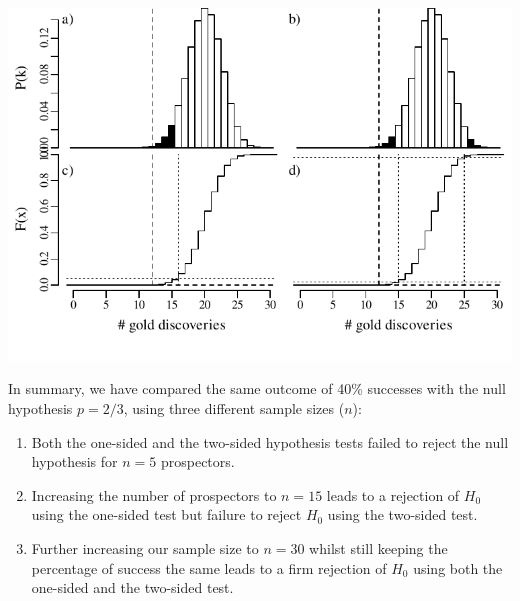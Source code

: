 \noindent\begin{minipage}[t][][b]{.65\textwidth}
  \includegraphics[]{../figures/binomialrejection30.pdf}
\end{minipage}
\begin{minipage}[t][][t]{.35\textwidth}
  \label{fig:binomialrejection30}
\end{minipage}

In summary, we have compared the same outcome of 40\% successes with
the null hypothesis $p=2/3$, using three different sample sizes ($n$):

\begin{enumerate}
  \item Both the one-sided and the two-sided hypothesis tests failed
    to reject the null hypothesis for $n=5$ prospectors.
  \item Increasing the number of prospectors to $n=15$ leads to a
    rejection of $H_0$ using the one-sided test but failure to reject
    $H_0$ using the two-sided test.
  \item Further increasing our sample size to $n=30$ whilst still
    keeping the percentage of success the same leads to a firm
    rejection of $H_0$ using both the one-sided and the two-sided
    test.
\end{enumerate}

